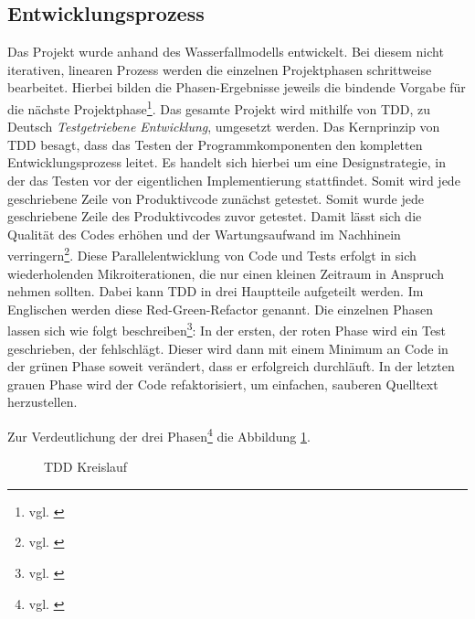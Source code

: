 \subsection{Entwicklungsprozess}
\label{sec:Entwicklungsprozess}
Das Projekt wurde anhand des Wasserfallmodells entwickelt.
Bei diesem nicht iterativen, linearen Prozess werden die einzelnen Projektphasen schrittweise bearbeitet. Hierbei bilden die Phasen-Ergebnisse jeweils die bindende Vorgabe für die nächste Projektphase\footnote{vgl. \cite[S. 263]{ItHandbuch}}.
Das gesamte Projekt wird mithilfe von \ac{TDD}, zu Deutsch \textit{Testgetriebene Entwicklung}, umgesetzt werden. Das Kernprinzip von \ac{TDD} besagt, dass das Testen der Programmkomponenten den kompletten Entwicklungsprozess leitet.
Es handelt sich hierbei um eine Designstrategie, in der das Testen vor der eigentlichen Implementierung stattfindet. Somit wird jede geschriebene Zeile von Produktivcode zunächst getestet.
Somit wurde jede geschriebene Zeile des Produktivcodes zuvor getestet.
Damit lässt sich die Qualität des Codes erhöhen und der Wartungsaufwand im Nachhinein verringern\footnote{vgl. \cite{datenschutzbeauftragter}}.
Diese Parallelentwicklung von Code und Tests erfolgt in sich wiederholenden Mikroiterationen, die nur einen kleinen Zeitraum in Anspruch nehmen sollten. Dabei kann \ac{TDD} in drei Hauptteile aufgeteilt werden. Im Englischen werden diese \glqq Red-Green-Refactor\grqq{} genannt. 
Die einzelnen Phasen lassen sich wie folgt beschreiben\footnote{vgl. \cite{tddwiki}}:
In der ersten, der roten Phase wird ein Test geschrieben, der fehlschlägt. Dieser wird dann mit einem Minimum an Code in der grünen Phase soweit verändert, dass er erfolgreich durchläuft. In der letzten grauen Phase wird der Code refaktorisiert, um einfachen, sauberen Quelltext herzustellen. 

Zur Verdeutlichung der drei Phasen\footnote{vgl. \cite{tddcircle}} die Abbildung \ref{fig:tddcircle}.
\begin{figure}[htb!]
\centering
{}
\caption{\ac{TDD} Kreislauf}
\label{fig:tddcircle}%
\end{figure}